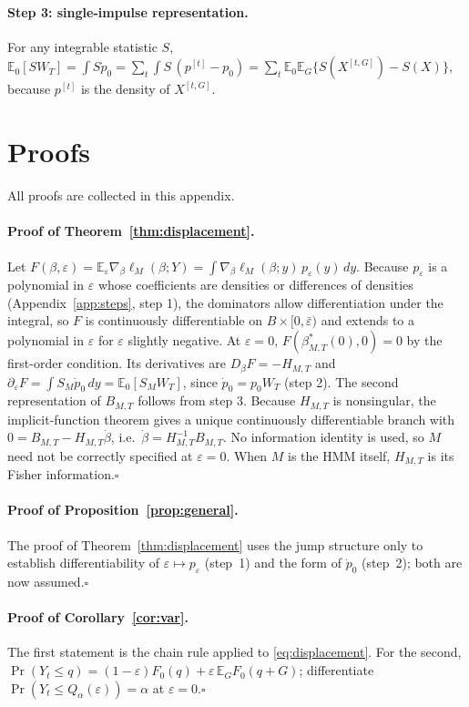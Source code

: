 \documentclass[11pt,a4paper]{article}
\theoremstyle{definition}
\theoremstyle{remark}
\newcommand{\E}{\mathbb{E}}
\begin{document}
\paragraph{Step 3: single-impulse representation.} For any integrable statistic $S$, $\E_0[SW_T]=\int S\dot p_0=\sum_t\int S\,(p^{[t]}-p_0)=\sum_t\E_0\E_G\{S(X^{[t,G]})-S(X)\}$, because $p^{[t]}$ is the density of $X^{[t,G]}$.

\section{Proofs}\label{app:proofs}
All proofs are collected in this appendix.

\paragraph{Proof of Theorem~\ref{thm:displacement}.}
Let $F(\beta,\varepsilon)=\E_\varepsilon\nabla_\beta\ell_M(\beta;Y)=\int\nabla_\beta\ell_M(\beta;y)\,p_\varepsilon(y)\,dy$. Because $p_\varepsilon$ is a polynomial in $\varepsilon$ whose coefficients are densities or differences of densities (Appendix~\ref{app:steps}, step 1), the dominators allow differentiation under the integral, so $F$ is continuously differentiable on $B\times[0,\bar\varepsilon)$ and extends to a polynomial in $\varepsilon$ for $\varepsilon$ slightly negative. At $\varepsilon=0$, $F(\beta^*_{M,T}(0),0)=0$ by the first-order condition. Its derivatives are $D_\beta F=-H_{M,T}$ and $\partial_\varepsilon F=\int S_M\dot p_0\,dy=\E_0[S_MW_T]$, since $\dot p_0=p_0W_T$ (step 2). The second representation of $B_{M,T}$ follows from step 3. Because $H_{M,T}$ is nonsingular, the implicit-function theorem gives a unique continuously differentiable branch with $0=B_{M,T}-H_{M,T}\dot\beta$, i.e.\ $\dot\beta=H_{M,T}^{-1}B_{M,T}$. No information identity is used, so $M$ need not be correctly specified at $\varepsilon=0$. When $M$ is the HMM itself, $H_{M,T}$ is its Fisher information.\hfill$\square$

\paragraph{Proof of Proposition~\ref{prop:general}.}
The proof of Theorem~\ref{thm:displacement} uses the jump structure only to establish differentiability of $\varepsilon\mapsto p_\varepsilon$ (step~1) and the form of $\dot p_0$ (step~2); both are now assumed.\hfill$\square$

\paragraph{Proof of Corollary~\ref{cor:var}.}
The first statement is the chain rule applied to \eqref{eq:displacement}. For the second, $\Pr(Y_t\le q)=(1-\varepsilon)F_0(q)+\varepsilon\,\E_GF_0(q+G)$; differentiate $\Pr(Y_t\le Q_\alpha(\varepsilon))=\alpha$ at $\varepsilon=0$.\hfill$\square$
\end{document}
